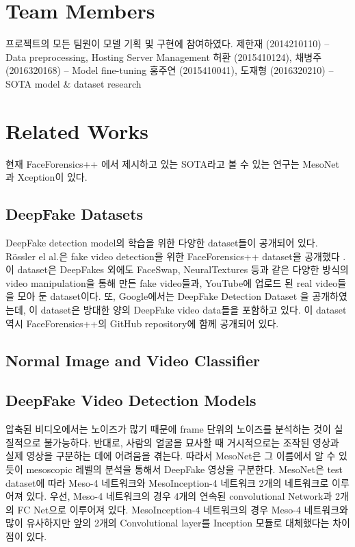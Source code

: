 \documentclass{article}
\begin{document}
	\section{Team Members}
	프로젝트의 모든 팀원이 모델 기획 및 구현에 참여하였다. \newline 
	제한재 (2014210110) -- Data preprocessing, Hosting Server Management\newline
	허환 (2015410124), 채병주 (2016320168) -- Model fine-tuning\newline
	홍주연 (2015410041), 도재형 (2016320210) -- SOTA model \& dataset research 
	\section{Related Works}
	
	현재 FaceForensics++ 에서 제시하고 있는 SOTA라고 볼 수 있는 연구는 MesoNet\cite{darius2018MesoNet} 과 Xception\cite{chollet2017xception}이 있다.
	
		\subsection{DeepFake Datasets}
		DeepFake detection model의 학습을 위한 다양한 dataset들이 공개되어 있다. R\"ossler el al.은 fake video detection을 위한 FaceForensics++ dataset을 공개했다 \cite{roessler2019faceforensicspp}. 이 dataset은 DeepFakes 외에도 FaceSwap, NeuralTextures 등과 같은 다양한 방식의 video manipulation을 통해 만든 fake video들과, YouTube에 업로드 된 real video들을 모아 둔 dataset이다. 또, Google에서는 DeepFake Detection Dataset \cite{DDD_GoogleJigSaw2019} 을 공개하였는데, 이 dataset은 방대한 양의 DeepFake video data들을 포함하고 있다. 이 dataset 역시 FaceForensics++의 GitHub 
		repository에 함께 공개되어 있다.
		
		\subsection{Normal Image and Video Classifier}
		
		\subsection{DeepFake Video Detection Models}
		압축된 비디오에서는 노이즈가 많기 때문에 frame 단위의 노이즈를 분석하는 것이 실질적으로 불가능하다. 반대로, 사람의 얼굴을 묘사할 때 거시적으로는 조작된 영상과 실제 영상을 구분하는 데에 어려움을 겪는다. 따라서 MesoNet은 그 이름에서 알 수 있듯이 mesoscopic 레벨의 분석을 통해서 DeepFake 영상을 구분한다. MesoNet은 test dataset에 따라 Meso-4 네트워크와 MesoInception-4 네트워크 2개의 네트워크로 이루어져 있다. 우선, Meso-4 네트워크의 경우 4개의 연속된 convolutional Network과 2개의 FC Net으로 이루어져 있다. MesoInception-4 네트워크의 경우 Meso-4 네트워크와 많이 유사하지만 앞의 2개의 Convolutional layer를 Inception 모듈로 대체했다는 차이점이 있다.
	
\end{document}

